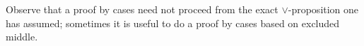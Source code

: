\documentclass[12pt]{article}
\newcommand{\AND}{\wedge}
\newcommand{\OR}{\vee}
\newcommand{\ARR}{\Rightarrow}
\newcommand{\DARR}{\Leftrightarrow}
\newcommand{\DRULEPF}[3]{\begin{tcolorbox}[title=Derived Rule: #1,colbacktitle=white,coltitle=black,colback=white] {#2} \tcblower \textbf{Proof:} {#3} \end{tcolorbox}}
\newcommand{\DRULEPZ}[2]{\begin{tcolorbox}[title=Derived Rule: #1,colbacktitle=white,coltitle=black,colback=white] {#2} \tcblower \textbf{Proof:} Exercise. \end{tcolorbox}}
\def\pA{\Phi}
\def\pB{\Psi}
\def\pC{\Omega}
\begin{document}
Observe that a proof by cases need not proceed from the exact $\OR$-proposition one has assumed;
sometimes it is useful to do a proof by cases based on excluded middle.

%
%
%




















\end{document}
